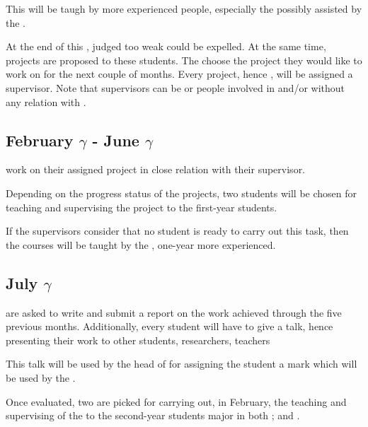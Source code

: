 \begin{multicols}{2}
This  will be taugh by more experienced 
people, especially the  possibly assisted by the
.

At the end of this ,  judged too weak
could be expelled. At the same time, projects are proposed to these students.
The  choose the project they would like to work on for the next
couple of months. Every project, hence , will be assigned a
supervisor. Note that supervisors can be  or people
involved in  and/or  without any relation with
.

%
%

\subsection{February $\gamma$ - June $\gamma$}

 work on their assigned project in close relation
with their supervisor.

Depending on the progress status of the  projects,
two students will be chosen for teaching and supervising the
 project to the  first-year students.

If the  supervisors consider that no student is
ready to carry out this task, then the courses will be taught by the
, one-year more experienced.

%
%

\subsection{July $\gamma$}

 are asked to write and submit a report on the
work achieved through the five previous months. Additionally, every student
will have to give a talk, hence presenting their work to other 
students, researchers, teachers \etc{}

This talk will be used by the head of  for assigning the student a mark which will be used by the
.

Once evaluated, two  are picked for carrying out,
in February, the teaching and supervising of the  to the second-year students major in both ; and .


\end{multicols}
